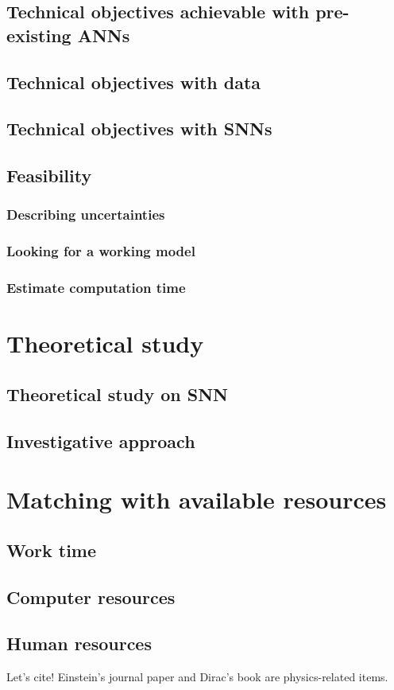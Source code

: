 \documentclass{article}
\begin{document}
\subsection{Technical objectives achievable with pre-existing ANNs}
\subsection{Technical objectives with data}
\subsection{Technical objectives with SNNs}
\subsection{Feasibility}
\subsubsection{Describing uncertainties}
\subsubsection{Looking for a working model}
\subsubsection{Estimate computation time}

\section{Theoretical study}
\subsection{Theoretical study on SNN}
\subsection{Investigative approach}

\section{Matching with available resources}
\subsection{Work time}
\subsection{Computer resources}
\subsection{Human resources}

Let's cite! Einstein's journal paper \cite{einstein} and Dirac's
book \cite{dirac} are physics-related items. 
\end{document}
